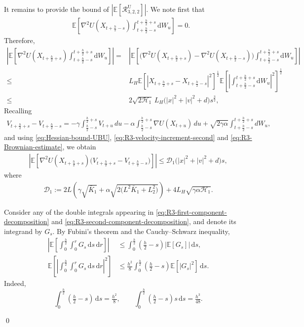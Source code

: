 \documentclass[12pt]{article}
\newenvironment{redtext}
  {\color{black}\ignorespaces}
  {\ignorespacesafterend}
\numberwithin{equation}{section}
\renewenvironment{proof}%
  {\begin{trivlist}%
   \item[]\ignorespaces}%
  {\qed\end{trivlist}}
\newcommand{\E}{\mathbb{E}}
\newcommand{\dd}{\mathrm{d}}
\begin{document}
\begin{redtext}
\begin{proof}
It remains to provide the bound of \(|\E[\mathcal R^{\mathrm{U}}_{3,2,2}]|\).
We note first that
\begin{align}
&\E
\left[
\nabla^2U(X_{t+\frac h2-s})
\int_{t+\frac h2-s}^{t+\frac h2+s}
\dd W_u
\right]
=
0.
\label{eq:R3-Brownian-zero}
\end{align}
Therefore,
\begin{align}
\left|
\E
\left[
\nabla^2U(X_{t+\frac h2+s})
\int_{t+\frac h2-s}^{t+\frac h2+s}
\dd W_u
\right]
\right|
=&
\left|
\E
\left[
\Big(
\nabla^2U(X_{t+\frac h2+s})
-
\nabla^2U(X_{t+\frac h2-s})
\Big)
\int_{t+\frac h2-s}^{t+\frac h2+s}
\dd W_u
\right]
\right|
\nonumber\\
\leq&
L_H
\E
\left[
\left|
X_{t+\frac h2+s}
-
X_{t+\frac h2-s}
\right|^2
\right]^{\frac12}
\E
\left[
\left|
\int_{t+\frac h2-s}^{t+\frac h2+s}
\dd W_u
\right|^2
\right]^{\frac12}
\nonumber\\
\leq&
2\sqrt{2\mathscr H_1}\,L_H
\bigl(
|x|^2+|v|^2+d
\bigr)s^{\frac{3}{2}},
\label{eq:R3-Brownian-estimate}
\end{align}
Recalling
\begin{align}
V_{t+\frac{h}{2}+s}-V_{t+\frac{h}{2}-s}
=
-\gamma\int_{\frac{h}{2}-s}^{\frac{h}{2}+s}V_{t+u}\,du
-\alpha\int_{\frac{h}{2}-s}^{\frac{h}{2}+s}
\nabla U(X_{t+u})\,du
+
\sqrt{2\gamma\alpha}
\int_{t+\frac{h}{2}-s}^{t+\frac{h}{2}+s}dW_u,
\end{align}
and using \eqref{eq:Hessian-bound-UBU}, \eqref{eq:R3-velocity-increment-second} and \eqref{eq:R3-Brownian-estimate}, we obtain
\begin{align}
\left|
\E
\left[
\nabla^2U(X_{t+\frac h2+s})
\Big(
V_{t+\frac h2+s}
-
V_{t+\frac h2-s}
\Big)
\right]
\right|
\leq
\mathcal D_1
\bigl(
|x|^2+|v|^2+d
\bigr)s,
\label{eq:R3-HV-mean-estimate}
\end{align}
where
\begin{equation}
\begin{aligned}
\mathcal D_1
:=
2L
\left(
\gamma\sqrt{\bar K_1}
+
\alpha
\sqrt{
2\bigl(
L^2\bar K_1+L_2^2
\bigr)
}
\right)
+
4L_H
\sqrt{
\gamma\alpha\mathscr H_1
}.
\end{aligned}
\end{equation}

Consider any of the double
integrals appearing in
\eqref{eq:R3-first-component-decomposition} and
\eqref{eq:R3-second-component-decomposition}, and denote its
integrand by \(G_s\). By Fubini's theorem and the
Cauchy--Schwarz inequality,
\begin{align}
\left|
\E\left[
\int_0^{\frac h2}\int_0^r G_s\,\dd s\,\dd r
\right]
\right|
&\leq
\int_0^{\frac h2}
\left(\tfrac h2-s\right)
|\E[G_s]|\,\dd s,
\label{eq:R3-double-integral-weak}
\\
\E\left[
\left|
\int_0^{\frac h2}\int_0^r G_s\,\dd s\,\dd r
\right|^2
\right]
&\leq
\tfrac{h^2}{8}
\int_0^{\frac h2}
\left(\tfrac h2-s\right)
\E[|G_s|^2]\,\dd s.
\label{eq:R3-double-integral-strong}
\end{align}
Indeed,
\[
\int_0^{\frac h2}
\left(\tfrac h2-s\right)\,\dd s
=
\tfrac{h^2}{8},
\qquad
\int_0^{\frac h2}
\left(\tfrac h2-s\right)s\,\dd s
=
\tfrac{h^3}{48}.
\]


\end{proof}
\end{redtext}
\end{document}
